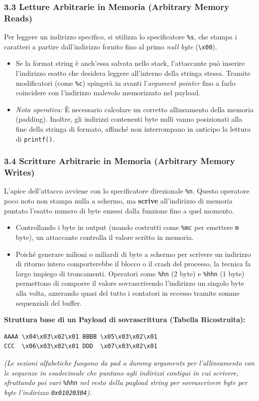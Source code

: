 \documentclass{article}
\begin{document}
\subsubsection{3.3 Letture Arbitrarie in Memoria (Arbitrary Memory Reads)}
Per leggere un indirizzo specifico, si utilizza lo specificatore \texttt{\%s}, che stampa i caratteri a partire dall'indirizzo fornito fino al primo \emph{null byte} (\texttt{\textbackslash x00}).
\begin{itemize}
    \item Se la format string è anch'essa salvata nello stack, l'attaccante può inserire l'indirizzo esatto che desidera leggere all'interno della stringa stessa. Tramite modificatori (come \texttt{\%c}) spingerà in avanti l'\emph{argument pointer} fino a farlo coincidere con l'indirizzo malevolo memorizzato nel payload.
    \item \emph{Nota operativa:} È necessario calcolare un corretto allineamento della memoria (padding). Inoltre, gli indirizzi contenenti byte nulli vanno posizionati alla fine della stringa di formato, affinché non interrompano in anticipo la lettura di \texttt{printf()}.
\end{itemize}

\subsubsection{3.4 Scritture Arbitrarie in Memoria (Arbitrary Memory Writes)}
L'apice dell'attacco avviene con lo specificatore direzionale \texttt{\%n}. Questo operatore poco noto non stampa nulla a schermo, ma \textbf{scrive} all'indirizzo di memoria puntato l'esatto numero di byte emessi dalla funzione fino a quel momento.
\begin{itemize}
    \item Controllando i byte in output (usando costrutti come \texttt{\%mc} per emettere \texttt{m} byte), un attaccante controlla il valore scritto in memoria.
    \item Poiché generare milioni o miliardi di byte a schermo per scrivere un indirizzo di ritorno intero comporterebbe il blocco o il crash del processo, la tecnica fa largo impiego di troncamenti. Operatori come \texttt{\%hn} (2 byte) e \texttt{\%hhn} (1 byte) permettono di comporre il valore sovrascrivendo l'indirizzo un singolo byte alla volta, azzerando quasi del tutto i contatori in eccesso tramite somme sequenziali del buffer.
\end{itemize}

\textbf{Struttura base di un Payload di sovrascrittura (Tabella Ricostruita):}
\begin{verbatim}
AAAA \x04\x03\x02\x01 BBBB \x05\x03\x02\x01
CCC  \x06\x03\x02\x01 DDD  \x07\x03\x02\x01
\end{verbatim}
\emph{(Le sezioni alfabetiche fungono da pad o dummy arguments per l'allineamento con le sequenze in esadecimale che puntano agli indirizzi contigui in cui scrivere, sfruttando poi vari \texttt{\%hhn} nel resto della payload string per sovrascrivere byte per byte l'indirizzo \texttt{0x01020304}).}
\end{document}
